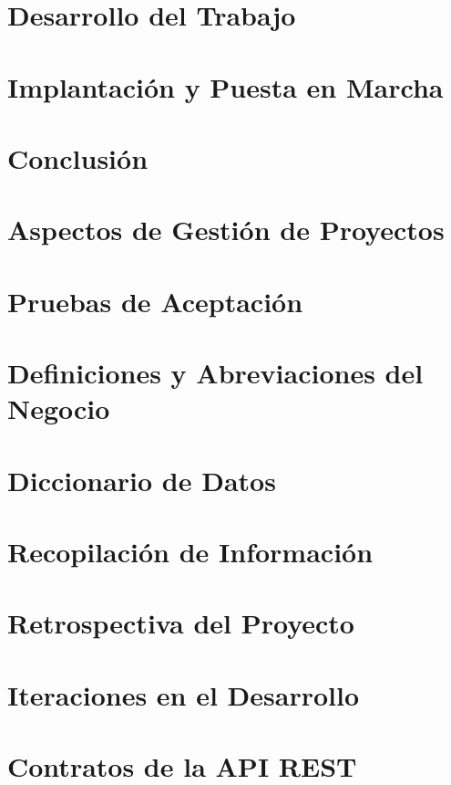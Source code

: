\documentclass[final,letterpaper,oneside,authoryear,11pt,singlespace,spanish]{ezthesis}
\begin{document}
\chapter{Desarrollo del Trabajo}
\label{cap:desarrollo}


\chapter{Implantación y Puesta en Marcha}
\label{cap:implantacion}


\chapter{Conclusión}
\label{cap:conclusion}




\appendix

\chapter{Aspectos de Gestión de Proyectos}\label{anexo:gestion}


\chapter{Pruebas de Aceptación}\label{anexo:pruebas}


\chapter{Definiciones y Abreviaciones del Negocio}\label{anexo:glosario}


\chapter{Diccionario de Datos}\label{anexo:diccionario}


\chapter{Recopilación de Información}\label{anexo:recopilacion}


\chapter{Retrospectiva del Proyecto}\label{anexo:retrospectiva}


\chapter{Iteraciones en el Desarrollo}\label{anexo:iteraciones}


\chapter{Contratos de la API REST}\label{anexo:endpoints}

\end{document}
